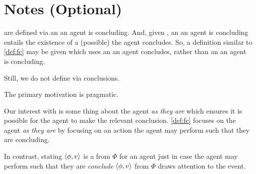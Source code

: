 

\section[Notes]{Notes \hfill (Optional)}



\begin{note}
   are defined via an  an agent is concluding.
  And, given \assuPP{}, an  an agent is concluding entails the existence of a (possible)  the agent concludes.
  So, a definition similar to \autoref{def:fc} may be given which uses an  an agent concludes, rather than an  an agent is concluding.

  Still, we do not define  via conclusions.
\end{note}

\begin{note}
  The primary motivation is pragmatic.

  Our interest with  is some thing about the agent \emph{as they are} which ensures it is possible for the agent to make the relevant conclusion.
  \autoref{def:fc} focuses on the agent \emph{as they are} by focusing on an action the agent may perform such that they are concluding.

  In contrast, stating \(\langle\phi, v\rangle\) is a \fc{} from \(\Phi\) for an agent just in case the agent may perform such that they are \emph{conclude} \(\langle\phi, v\rangle\) from \(\Phi\) draws attention to the event.
\end{note}

